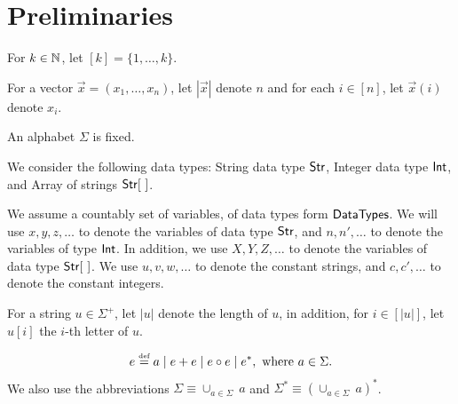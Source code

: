 \documentclass{llncs}
\begin{document}
\section{Preliminaries}

For $k \in \mathbb{N}$, let $[k] = \{1,\dots, k\}$.

For a vector $\vec{x}=(x_1,\dots, x_n)$, let $|\vec{x}|$ denote $n$ and for each $i \in [n]$, let $\vec{x}(i)$ denote $x_i$.

An alphabet $\Sigma$ is fixed.

We consider the following data types: String data type ${\sf Str}$, Integer data type ${\sf Int}$, and Array of strings $\str [\ ]$.


We assume a countably set of variables, of data types form ${\sf DataTypes}$. We will use $x, y, z, \dots$ to denote the variables of data type ${\sf Str}$, and $n, n', \dots$ to denote the variables of type ${\sf Int}$. In addition, we use $X, Y, Z, \dots$ to denote the variables of data type $\str[\ ]$.
We use $u, v, w, \dots$ to denote the constant strings, and $c, c',\dots$ to denote the constant integers.


For a string $u \in \Sigma^+$, let $|u|$ denote the length of $u$, in addition, for $i \in [|u|]$, let $u[i]$ the $i$-th letter of $u$.

\begin{definition}
\[e \eqdef a \mid e + e \mid e \concat e \mid e^\ast, \mbox{ where } a \in \Sigma. \]
We also use the abbreviations $\Sigma \equiv \cup_{a \in \Sigma}\ a$ and $\Sigma^\ast \equiv (\cup_{a \in \Sigma}\ a)^\ast$.
\end{definition}

\end{document}
